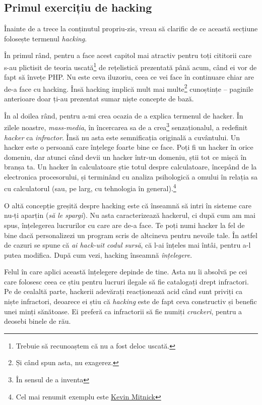 \subsection{Primul exercițiu de hacking}

Înainte de a trece la conținutul propriu-zis, vreau să clarific de ce această secțiune
folosește termenul \textsl{hacking}.

În primul rând, pentru a face acest capitol mai
atractiv pentru toți cititorii care s-au plictisit de teoria uscată\footnote{Trebuie să
recunoaștem că nu a fost deloc uscată.} de rețelistică
prezentată până acum,
când ei vor de fapt să învețe PHP. Nu este ceva iluzoriu, ceea ce vei face în continuare
chiar are de-a face cu hacking. Însă hacking implică mult mai multe\footnote{Și când
spun asta, nu exagerez.}
 cunoștințe -- paginile
anterioare doar ți-au prezentat sumar niște concepte de bază.

În al doilea rând, pentru a-mi crea ocazia de a explica termenul de hacker.
În zilele noastre, \textsl{mass-media}, în încercarea sa de a crea\footnote{În
sensul de {\glqq}a inventa{\grqq}} senzaționalul,
a redefinit \textsl{hacker} ca \textit{infractor}. Însă nu asta este semnificația
originală a cuvântului. Un hacker este o persoană care înțelege foarte bine ce
face. Poți fi un hacker în orice domeniu, dar atunci când devii un hacker într-un domeniu,
știi tot ce mișcă în branșa ta. Un hacker în calculatoare știe totul despre calculatoare,
începând de la electronica procesorului, și terminând cu analiza psihologică a
omului în relația sa cu
calculatorul (sau, pe larg, cu tehnologia în general).\footnote{Cel mai renumit exemplu este
\href{http://en.wikipedia.org/wiki/Kevin_Mitnick}{Kevin Mitnick}}

O altă concepție greșită despre hacking este că înseamnă să intri în sisteme care nu-ți
aparțin (\textit{să le spargi}). Nu asta caracterizează hackerul, ci după cum am mai spus,
înțelegerea lucrurilor cu care are de-a face. Te poți numi hacker la fel de bine
dacă personalizezi un program scris de altcineva pentru nevoile tale. În astfel
de cazuri se spune că \textsl{ai hack-uit codul sursă}, că l-ai înțeles mai întâi, pentru
a-l putea modifica. După cum vezi, hacking înseamnă \textit{înțelegere}.

Felul în care aplici această înțelegere depinde de tine. Asta nu îi absolvă pe
cei care folosesc ceea ce știu pentru lucruri ilegale să fie catalogați
drept infractori. Pe de cealaltă parte, hackerii adevărați reacționează acid
când sunt priviți ca niște infractori, deoarece ei
știu că \textsl{hacking} este de fapt ceva constructiv și benefic unei minți sănătoase.
Ei preferă ca infractorii să fie numiți \textsl{crackeri}, pentru a deosebi binele
de rău.


